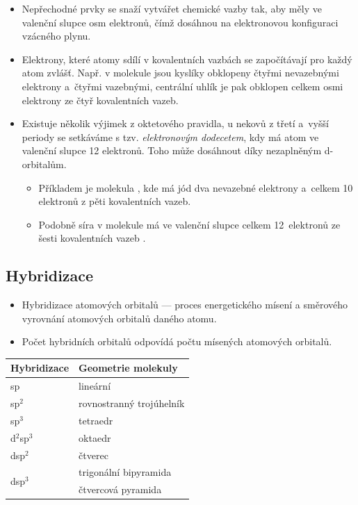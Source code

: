 \begin{itemize}
	\item Nepřechodné prvky se snaží vytvářet chemické vazby tak, aby měly ve valenční slupce osm elektronů, čímž dosáhnou na elektronovou konfiguraci vzácného plynu.
	\item Elektrony, které atomy sdílí v kovalentních vazbách se započítávají pro každý atom zvlášť. Např. v molekule  jsou kyslíky obklopeny čtyřmi nevazebnými elektrony a~čtyřmi vazebnými, centrální uhlík je pak obklopen celkem osmi elektrony ze čtyř kovalentních vazeb.
\end{itemize}

\begin{center}
\end{center}

\begin{itemize}
	\item Existuje několik výjimek z oktetového pravidla, u nekovů z třetí a~vyšší periody se setkáváme s tzv. \textit{elektronovým dodecetem}, kdy má atom ve valenční slupce 12 elektronů. Toho může dosáhnout díky nezaplněným d-orbitalům.
	\begin{itemize}
		\item Příkladem je molekula , kde má jód dva nevazebné elektrony a~celkem 10 elektronů z pěti kovalentních vazeb.
		\item Podobně síra v molekule  má ve valenční slupce celkem 12~elektronů ze šesti kovalentních vazeb .
	\end{itemize}
\end{itemize}

\clearpage
\subsection{Hybridizace}
\begin{itemize}
	\item Hybridizace atomových orbitalů --- proces energetického mísení a směrového vyrovnání atomových orbitalů daného atomu.
	\item Počet hybridních orbitalů odpovídá počtu mísených atomových orbitalů.
\end{itemize}
\begin{tabular}{|l|l|}
	\hline
	\textbf{Hybridizace} & \textbf{Geometrie molekuly} \\
	\hline
	sp & lineární \\
	\hline
	sp$^2$ & rovnostranný trojúhelník \\
	\hline
	sp$^3$ & tetraedr \\
	\hline
	d$^2$sp$^3$ & oktaedr \\
	\hline
	dsp$^2$ & čtverec \\
	\hline
	\multirow{2}{*}{dsp$^3$} & trigonální bipyramida \\
	& čtvercová pyramida \\
	\hline
\end{tabular}


